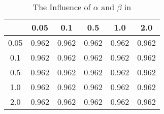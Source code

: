 \begin{table}[htb]
\caption{The Influence of $\alpha$ and $\beta$ in }
\label{tab: parameter}
\centering
\begin{tabular}{c|c|c|c|c|c}
\toprule
\diagbox{$\alpha$}{$\beta$} & 0.05 & 0.1 & 0.5 & 1.0 & 2.0 \\ \midrule
0.05 & 0.962 & 0.962 & 0.962 & 0.962 & 0.962 \\
0.1 & 0.962 & 0.962 & 0.962 & 0.962 & 0.962 \\
0.5 & 0.962 & 0.962 & 0.962 & 0.962 & 0.962 \\
1.0 & 0.962 & 0.962 & 0.962 & 0.962 & 0.962 \\
2.0 & 0.962 & 0.962 & 0.962 & 0.962 & 0.962 \\
                      
\bottomrule
\end{tabular}  
\end{table}